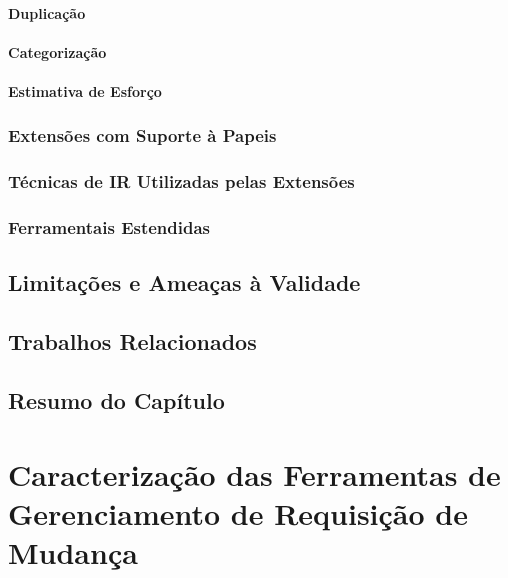 \documentclass[msc]{ppgccufmg} %
\begin{document}
\subsubsection{Duplicação}
\subsubsection{Categorização}
\subsubsection{Estimativa de Esforço}



\subsection{Extensões com Suporte à Papeis}
\label{sub:extensões_com_suporte_à_papeis}


\subsection{Técnicas de IR Utilizadas pelas Extensões}
\label{sub:técnicas_de_ir_utilizadaas_pelas_extensões}


\subsection{Ferramentais Estendidas}
\label{sub:ferrramentas_extendidas}







\section{Limitações e Ameaças à Validade}

\section{Trabalhos Relacionados}

\section{Resumo do Capítulo}

\chapter{Caracterização das Ferramentas de Gerenciamento de Requisição de Mudança}
\label{ch:caracterizacao}
\end{document}
